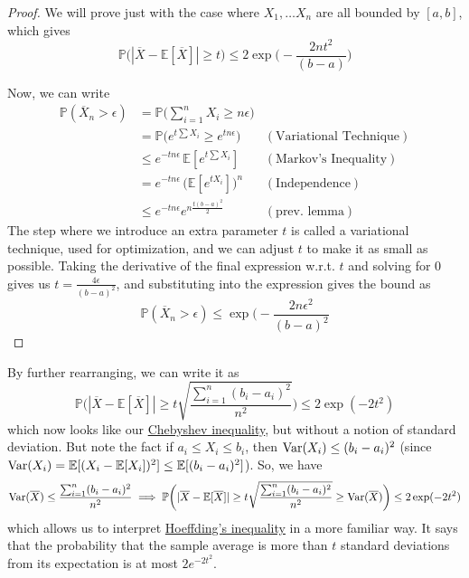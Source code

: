     \begin{proof}
      We will prove just with the case where $X_1, \ldots X_n$ are all bounded by $[a, b]$, which gives 
      \begin{equation}
        \mathbb{P} \big( |\overline{X} - \mathbb{E}[\overline{X}] | \geq t \big) \leq 2 \exp \bigg( - \frac{2 n t^2}{(b - a)}\bigg)
      \end{equation}
       
      Now, we can write 
      \begin{align*}
        \mathbb{P}(\overline{X}_n > \epsilon ) & = \mathbb{P} \Big( \sum_{i=1}^n X_i \geq n \epsilon \Big) \\
        & = \mathbb{P} \big( e^{t \sum X_i} \geq e^{t n \epsilon} \big) & (\text{Variational Technique}) \\
        & \leq e^{- t n \epsilon} \, \mathbb{E}[e^{t \sum X_i}] & (\text{Markov's Inequality}) \\
        & = e^{-t n \epsilon} \, \big( \mathbb{E}[ e^{t X_i}] \big)^n & (\text{Independence}) \\
        & \leq e^{-t n \epsilon} e^{n \frac{t (b - a)^2}{2}} & (\text{prev. lemma}) 
      \end{align*}
      The step where we introduce an extra parameter $t$ is called a variational technique, used for optimization, and we can adjust $t$ to make it as small as possible. Taking the derivative of the final expression w.r.t. $t$ and solving for $0$ gives us $t = \frac{4 \epsilon}{(b - a)^2}$, and substituting into the expression gives the bound as 
      \begin{equation}
        \mathbb{P}(\overline{X}_n > \epsilon ) \leq \exp \bigg(- \frac{2 n \epsilon^2}{(b - a)^2}
      \end{equation}
    \end{proof}

    By further rearranging, we can write it as 
    \begin{equation}
      \mathbb{P} \bigg( | \overline{X} - \mathbb{E}[\overline{X}] | \geq t \sqrt{\frac{\sum_{i=1}^n (b_i - a_i)^2}{n^2}} \bigg) \leq 2 \exp(-2t^2)
    \end{equation}
    which now looks like our \hyperref[thm:chebyshev-inequality]{Chebyshev inequality}, but without a notion of standard deviation. But note the fact if $a_i \leq X_i \leq b_i$, then $\operatorname{Var}(X_i) \leq (b_i - a_i)^2$ (since $\operatorname{Var}(X_i) = \mathbb{E}[(X_i - \mathbb{E}[X_i])^2] \leq \mathbb{E}[(b_i - a_i)^2]$). So, we have 
    \begin{equation}
      \operatorname{Var}(\overline{X}) \leq \frac{\sum_{i=1}^n (b_i - a_i)^2}{n^2} \implies \mathbb{P}\bigg( |\overline{X} - \mathbb{E}[\overline{X}] | \geq t \sqrt{\frac{\sum_{i=1}^n (b_i - a_i)^2}{n^2}} \geq \operatorname{Var}(\overline{X}) \bigg) \leq 2\exp(-2t^2)
    \end{equation}
    which allows us to interpret \hyperref[thm:hoeffdings-inequality]{Hoeffding's inequality} in a more familiar way. It says that the probability that the sample average is more than $t$ standard deviations from its expectation is at most $2 e^{-2t^2}$. 

